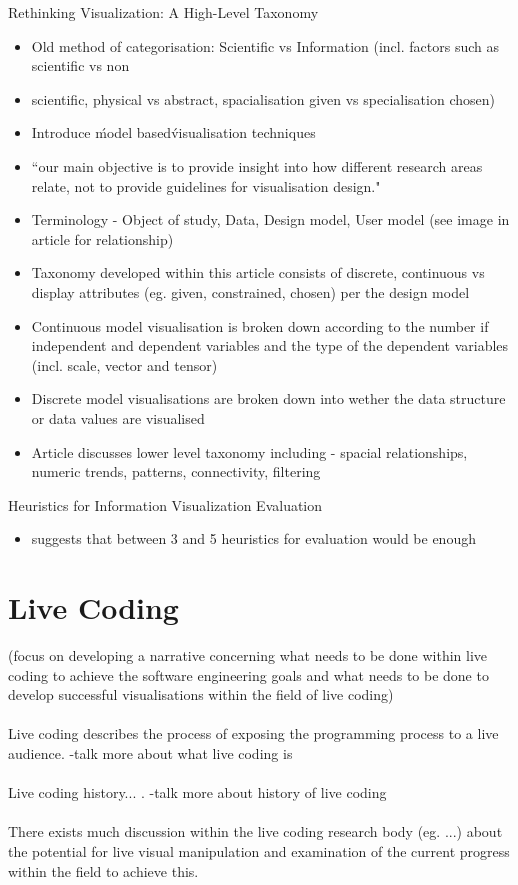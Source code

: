 Rethinking Visualization: A High-Level Taxonomy
\begin{itemize}
\item Old method of categorisation: Scientific vs Information (incl. factors such as scientific vs non\item scientific, physical vs abstract, spacialisation given vs specialisation chosen)
\item Introduce \'model based\' visualisation techniques
\item “our main objective is to provide insight into how different research areas relate, not to provide guidelines for visualisation design."
\item Terminology - Object of study, Data, Design model, User model (see image in article for relationship)
\item Taxonomy developed within this article consists of {discrete, continuous} vs display attributes (eg. given, constrained, chosen) per the design model
\item Continuous model visualisation is broken down according to the number if independent and dependent variables and the type of the dependent variables (incl. scale, vector and tensor)
\item Discrete model visualisations are broken down into wether the data structure or data values are visualised

\item Article discusses lower level taxonomy including - spacial relationships, numeric trends, patterns, connectivity, filtering
\end{itemize}

Heuristics for Information Visualization Evaluation
\begin{itemize}
\item suggests that between 3 and 5 heuristics for evaluation would be enough
\end{itemize}

\section{Live Coding}
\label{sec:livecoding}

(focus on developing a narrative concerning what needs to be done within live coding to achieve the software engineering goals and what needs to be done to develop successful visualisations within the field of live coding)
\\\\
Live coding describes the process of exposing the programming process to a live audience. -talk more about what live coding is
\\\\
Live coding history... . -talk more about history of live coding
\\\\
There exists much discussion within the live coding research body (eg. ...) about the potential for live visual manipulation and examination of the current progress within the field to achieve this.


